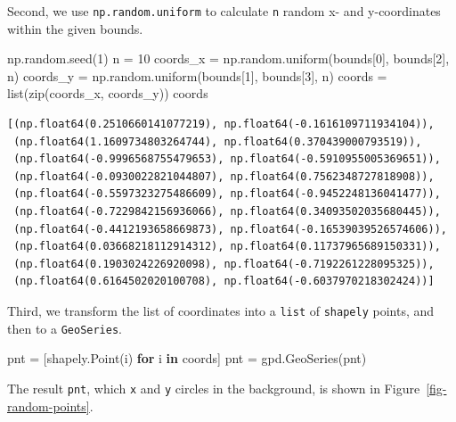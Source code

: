 \documentclass[
  letterpaper,
]{krantz}
\newenvironment{Shaded}{\begin{snugshade}}{\end{snugshade}}
\newcommand{\BuiltInTok}[1]{\textcolor[rgb]{0.00,0.23,0.31}{#1}}
\newcommand{\ControlFlowTok}[1]{\textcolor[rgb]{0.00,0.23,0.31}{\textbf{#1}}}
\newcommand{\DecValTok}[1]{\textcolor[rgb]{0.68,0.00,0.00}{#1}}
\newcommand{\KeywordTok}[1]{\textcolor[rgb]{0.00,0.23,0.31}{\textbf{#1}}}
\newcommand{\NormalTok}[1]{\textcolor[rgb]{0.00,0.23,0.31}{#1}}
\newcommand{\OperatorTok}[1]{\textcolor[rgb]{0.37,0.37,0.37}{#1}}
\begin{document}
Second, we use \texttt{np.random.uniform} to calculate \texttt{n} random
x- and y-coordinates within the given bounds.

\begin{Shaded}
\begin{Highlighting}[]
\NormalTok{np.random.seed(}\DecValTok{1}\NormalTok{)}
\NormalTok{n }\OperatorTok{=} \DecValTok{10}
\NormalTok{coords\_x }\OperatorTok{=}\NormalTok{ np.random.uniform(bounds[}\DecValTok{0}\NormalTok{], bounds[}\DecValTok{2}\NormalTok{], n)}
\NormalTok{coords\_y }\OperatorTok{=}\NormalTok{ np.random.uniform(bounds[}\DecValTok{1}\NormalTok{], bounds[}\DecValTok{3}\NormalTok{], n)}
\NormalTok{coords }\OperatorTok{=} \BuiltInTok{list}\NormalTok{(}\BuiltInTok{zip}\NormalTok{(coords\_x, coords\_y))}
\NormalTok{coords}
\end{Highlighting}
\end{Shaded}

\begin{verbatim}
[(np.float64(0.2510660141077219), np.float64(-0.1616109711934104)),
 (np.float64(1.1609734803264744), np.float64(0.370439000793519)),
 (np.float64(-0.9996568755479653), np.float64(-0.5910955005369651)),
 (np.float64(-0.0930022821044807), np.float64(0.7562348727818908)),
 (np.float64(-0.5597323275486609), np.float64(-0.9452248136041477)),
 (np.float64(-0.7229842156936066), np.float64(0.34093502035680445)),
 (np.float64(-0.4412193658669873), np.float64(-0.16539039526574606)),
 (np.float64(0.03668218112914312), np.float64(0.11737965689150331)),
 (np.float64(0.1903024226920098), np.float64(-0.7192261228095325)),
 (np.float64(0.6164502020100708), np.float64(-0.6037970218302424))]
\end{verbatim}

Third, we transform the list of coordinates into a \texttt{list} of
\texttt{shapely} points, and then to a \texttt{GeoSeries}.

\begin{Shaded}
\begin{Highlighting}[]
\NormalTok{pnt }\OperatorTok{=}\NormalTok{ [shapely.Point(i) }\ControlFlowTok{for}\NormalTok{ i }\KeywordTok{in}\NormalTok{ coords]}
\NormalTok{pnt }\OperatorTok{=}\NormalTok{ gpd.GeoSeries(pnt)}
\end{Highlighting}
\end{Shaded}

The result \texttt{pnt}, which \texttt{x} and \texttt{y} circles in the
background, is shown in Figure~\ref{fig-random-points}.
\end{document}
